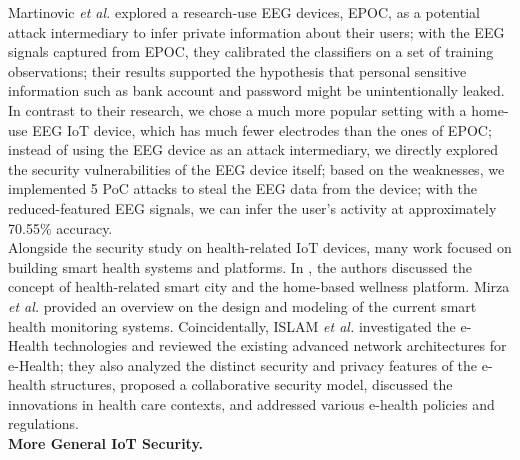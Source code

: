 %
\indent Martinovic \emph{et al.} \cite{martinovic2012feasibility} explored a research-use EEG devices, EPOC, as a potential attack intermediary to infer private information about their users; with the EEG signals captured from EPOC, they calibrated the classifiers on a set of training observations; their results supported the hypothesis that personal sensitive information such as bank account and password might be unintentionally leaked. In contrast to their research, we chose a much more popular setting with a home-use EEG IoT device, which has much fewer electrodes than the ones of EPOC; instead of using the EEG device as an attack intermediary, we directly explored the security vulnerabilities of the EEG device itself; based on the weaknesses, we implemented 5 PoC attacks to steal the EEG data from the device; with the reduced-featured EEG signals, we can infer the user's activity at approximately 70.55\% accuracy.\\
\indent
Alongside the security study on health-related IoT devices, many work focused on building smart health systems and platforms. In \cite{solanas2014smart} \cite{yang2014health}, the authors discussed the concept of health-related smart city and the home-based wellness platform. Mirza \emph{et al.} \cite{baig2013smart} provided an overview on the design and modeling of the current smart health monitoring systems. Coincidentally, ISLAM \emph{et al.} \cite{islam2015internet} investigated the e-Health technologies and reviewed the existing advanced network architectures for e-Health; they also analyzed the distinct security and privacy features of the e-health structures, proposed a collaborative security model, discussed the innovations in health care contexts, and addressed various e-health policies and regulations.\\
%
\indent\textbf{More General IoT Security.}

